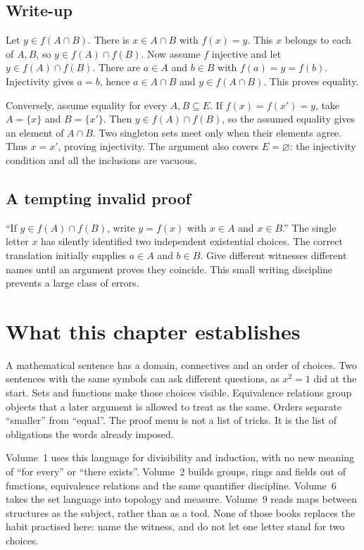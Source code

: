\subsection*{Write-up}

Let $y\in f(A\cap B)$. There is $x\in A\cap B$ with $f(x)=y$.
This $x$ belongs to each of $A,B$, so $y\in f(A)\cap f(B)$.
Now assume $f$ injective and let $y\in f(A)\cap f(B)$. There are $a\in A$
and $b\in B$ with $f(a)=y=f(b)$. Injectivity gives $a=b$, hence
$a\in A\cap B$ and $y\in f(A\cap B)$. This proves equality.

Conversely, assume equality for every $A,B\subseteq E$. If $f(x)=f(x')=y$,
take $A=\{x\}$ and $B=\{x'\}$. Then $y\in f(A)\cap f(B)$, so the
assumed equality gives an element of $A\cap B$. Two singleton sets meet only
when their elements agree. Thus $x=x'$, proving injectivity. The argument also
covers $E=\varnothing$: the injectivity condition and all the inclusions are vacuous.

\subsection*{A tempting invalid proof}

``If $y\in f(A)\cap f(B)$, write $y=f(x)$ with $x\in A$ and $x\in B$.''
The single letter $x$ has silently identified two independent existential choices.
The correct translation initially supplies $a\in A$ and $b\in B$.
Give different witnesses different names until an argument proves they coincide.
This small writing discipline prevents a large class of errors.

\section*{What this chapter establishes}
A mathematical sentence has a domain, connectives and an order of choices. Two
sentences with the same symbols can ask different questions, as $x^2=1$ did at the
start. Sets and functions make those choices visible. Equivalence relations group
objects that a later argument is allowed to treat as the same. Orders separate
``smaller'' from ``equal''. The proof menu is not a list of tricks. It is the list
of obligations the words already imposed.

Volume~1 uses this language for divisibility and induction, with no new meaning of
``for every'' or ``there exists''. Volume~2 builds groups, rings and fields out of
functions, equivalence relations and the same quantifier discipline. Volume~6 takes
the set language into topology and measure. Volume~9 reads maps between structures
as the subject, rather than as a tool. None of those books replaces the habit
practised here: name the witness, and do not let one letter stand for two choices.

